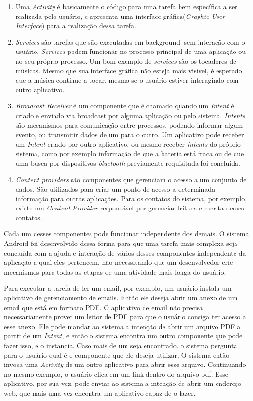 \begin{enumerate}
\item Uma \textit{Activity} é basicamente o código para uma tarefa bem específica a ser realizada pelo usuário, e apresenta uma interface gráfica(\textit{Graphic User Interface}) para a realização dessa tarefa.

\item \textit{Services} são tarefas que são executadas em background, sem interação com o usuário. \textit{Services} podem funcionar no processo principal de uma aplicação ou no seu próprio processo. Um bom exemplo de \textit{services} são os tocadores de músicas. Mesmo que sua interface gráfica não esteja mais visível, é esperado que a música continue a tocar, mesmo se o usuário estiver interagindo com outro aplicativo. 

\item \textit{Broadcast Receiver} é um componente que é chamado quando um \textit{Intent} é criado e enviado via broadcast por alguma aplicação ou pelo sistema. \textit{Intents} são mecanismos para comunicação entre processos, podendo informar algum evento, ou transmitir dados de um para o outro.
Um aplicativo pode receber um \textit{Intent} criado por outro aplicativo, ou mesmo receber \textit{intents} do próprio sistema, como por exemplo informação de que a bateria está fraca ou de que uma busca por dispositivos \textit{bluetooth} previamente requisitada foi concluída. 

\item \textit{Content providers} são componentes que gerenciam o acesso a um conjunto de dados. São utilizados para criar um ponto de acesso a determinada informação para outras aplicações. Para os contatos do sistema, por exemplo, existe um \textit{Content Provider} responsável por gerenciar leitura e escrita desses contatos. 
\end{enumerate}


Cada um desses componentes pode funcionar independente dos demais. O sistema Android foi desenvolvido dessa forma para que uma tarefa mais complexa seja concluída com a ajuda e interação de vários desses componentes independente da aplicação a qual eles pertencem, não necessitando que um desenvolvedor crie mecanismos para todas as etapas de uma atividade mais longa do usuário.  

Para executar a tarefa de ler um email, por exemplo, um usuário instala um aplicativo de gerenciamento de emails. Então ele deseja abrir um anexo de um email que está em formato PDF. O aplicativo de email não precisa necessariamente prover um leitor de PDF para que o usuário consiga ter acesso a esse anexo. Ele pode mandar ao sistema a intenção de abrir um arquivo PDF a partir de um \textit{Intent}, e então o sistema encontra um outro componente que pode fazer isso, e o instancia. Caso mais de um seja encontrado, o sistema pergunta para o usuário qual é o componente que ele deseja utilizar. O sistema então invoca uma \textit{Activity} de um outro aplicativo para abrir esse arquivo. Continuando no mesmo exemplo, o usuário clica em um link dentro do arquivo pdf. Esse aplicativo, por sua vez, pode enviar ao sistema a intenção de abrir um endereço web, que mais uma vez encontra um aplicativo capaz de o fazer.  

